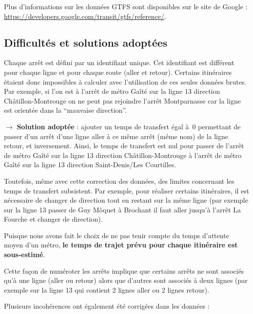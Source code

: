 \documentclass[,french]{article}
\begin{document}
Plus d'informations sur les données GTFS sont disponibles sur le site de
Google : \url{https://developers.google.com/transit/gtfs/reference/}.

\hypertarget{difficultuxe9s-et-solutions-adoptuxe9es}{%
\subsection{Difficultés et solutions
adoptées}\label{difficultuxe9s-et-solutions-adoptuxe9es}}

Chaque arrêt est défini par un identifiant unique. Cet identifiant est
différent pour chaque ligne et pour chaque route (aller et retour).
Certains itinéraires étaient donc impossibles à calculer avec
l'utilisation de ces seules données brutes. Par exemple, si l'on est à
l'arrêt de métro Gaîté sur la ligne 13 direction Châtillon-Montrouge on
ne peut pas rejoindre l'arrêt Montparnasse car la ligne est orientée
dans la ``mauvaise direction''.

\(\rightarrow\) \textbf{Solution adoptée} : ajouter un temps de
transfert égal à~0 permettant de passer d'un arrêt d'une ligne aller à
ce même arrêt (même nom) de la ligne retour, et inversement. Ainsi, le
temps de transfert est nul pour passer de l'arrêt de métro Gaîté sur la
ligne 13 direction Châtillon-Montrouge à l'arrêt de métro Gaîté sur la
ligne 13 direction Saint-Denis/Les Courtilles.

Toutefois, même avec cette correction des données, des limites
concernant les temps de transfert subsistent. Par exemple, pour réaliser
certains itinéraires, il est nécessaire de changer de direction tout en
restant sur la même ligne (par exemple sur la ligne 13 passer de Guy
Môquet à Brochant il faut aller jusqu'à l'arrêt La Fourche et changer de
direction).

Puisque nous avons fait le choix de ne pas tenir compte du temps
d'attente moyen d'un métro, \textbf{le temps de trajet prévu pour chaque
itinéraire est sous-estimé}.

Cette façon de numéroter les arrêts implique que certains arrêts ne sont
associés qu'à une ligne (aller ou retour) alors que d'autres sont
associés à deux lignes (par exemple sur la ligne 13 qui contient 2
lignes aller ou 2 lignes retour).

Plusieurs incohérences ont également été corrigées dans les données :
\end{document}
